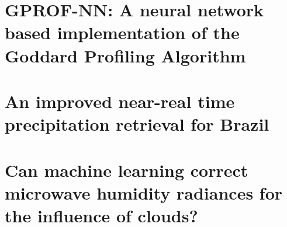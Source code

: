 \documentclass[12pt, a4paper, twoside]{report}
\begin{document}
\chapter{GPROF-NN: A neural network based implementation of the Goddard Profiling Algorithm} 
\label{chap:qrnn}
\thispagestyle{empty}       %
\cleardoublepage            %


\chapter{An improved near-real time precipitation retrieval for Brazil} 
\thispagestyle{empty}       %
\cleardoublepage            %


\chapter{Can machine learning correct microwave humidity radiances for the influence of clouds?} 
\thispagestyle{empty}       %
\cleardoublepage            %

\end{document}
